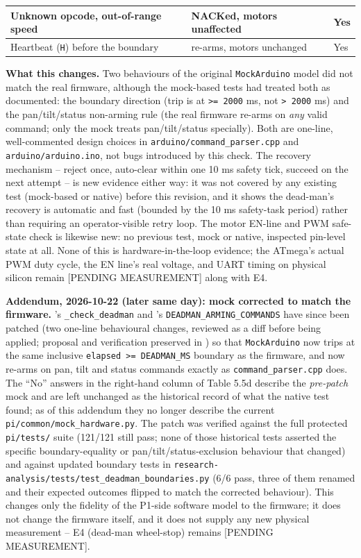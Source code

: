 \begin{center}
\begin{longtable}{|p{4cm}|p{5cm}|p{5cm}|}
\hline
Unknown opcode, out-of-range speed & NACKed, motors unaffected & Yes \\
\hline
Heartbeat (\texttt{H}) before the boundary & re-arms, motors unchanged & Yes \\
\hline
\end{longtable}
\end{center}

\textbf{What this changes.} Two behaviours of the original \texttt{MockArduino} model did not match the real firmware, although the mock-based tests had treated both as documented: the boundary direction (trip is at \texttt{>= 2000} ms, not \texttt{> 2000} ms) and the pan/tilt/status non-arming rule (the real firmware re-arms on \textit{any} valid command; only the mock treats pan/tilt/status specially). Both are one-line, well-commented design choices in \texttt{arduino/command\_parser.cpp} and \texttt{arduino/arduino.ino}, not bugs introduced by this check. The recovery mechanism -- reject once, auto-clear within one 10 ms safety tick, succeed on the next attempt -- is new evidence either way: it was not covered by any existing test (mock-based or native) before this revision, and it shows the dead-man's recovery is automatic and fast (bounded by the 10 ms safety-task period) rather than requiring an operator-visible retry loop. The motor EN-line and PWM safe-state check is likewise new: no previous test, mock or native, inspected pin-level state at all. None of this is hardware-in-the-loop evidence; the ATmega's actual PWM duty cycle, the EN line's real voltage, and UART timing on physical silicon remain [PENDING MEASUREMENT] along with E4.

\textbf{Addendum, 2026-10-22 (later same day): mock corrected to match the firmware.} \texttt{}'s \texttt{\_check\_deadman} and \texttt{}'s \texttt{DEADMAN\_ARMING\_COMMANDS} have since been patched (two one-line behavioural changes, reviewed as a diff before being applied; proposal and verification preserved in \texttt{}) so that \texttt{MockArduino} now trips at the same inclusive \texttt{elapsed >= DEADMAN\_MS} boundary as the firmware, and now re-arms on pan, tilt and status commands exactly as \texttt{command\_parser.cpp} does. The ``No'' answers in the right-hand column of Table 5.5d describe the \textit{pre-patch} mock and are left unchanged as the historical record of what the native test found; as of this addendum they no longer describe the current \texttt{pi/common/mock\_hardware.py}. The patch was verified against the full protected \texttt{pi/tests/} suite (121/121 still pass; none of those historical tests asserted the specific boundary-equality or pan/tilt/status-exclusion behaviour that changed) and against updated boundary tests in \texttt{research-analysis/tests/test\_deadman\_boundaries.py} (6/6 pass, three of them renamed and their expected outcomes flipped to match the corrected behaviour). This changes only the fidelity of the P1-side software model to the firmware; it does not change the firmware itself, and it does not supply any new physical measurement -- E4 (dead-man wheel-stop) remains [PENDING MEASUREMENT].

